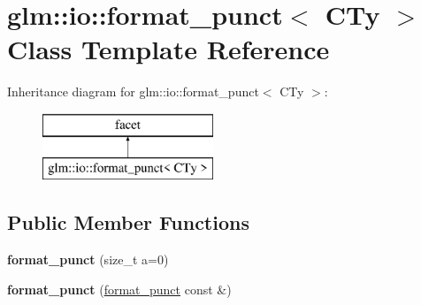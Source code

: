 \hypertarget{classglm_1_1io_1_1format__punct}{\section{glm\-:\-:io\-:\-:format\-\_\-punct$<$ C\-Ty $>$ Class Template Reference}
\label{classglm_1_1io_1_1format__punct}
}
Inheritance diagram for glm\-:\-:io\-:\-:format\-\_\-punct$<$ C\-Ty $>$\-:\begin{figure}[H]
\begin{center}
\leavevmode
\includegraphics[height=2.000000cm]{classglm_1_1io_1_1format__punct}
\end{center}
\end{figure}
\subsection*{Public Member Functions}
\begin{DoxyCompactItemize}
\item 
\hypertarget{classglm_1_1io_1_1format__punct_ae56e7a14fac2516658837281b9da4659}{{\bfseries format\-\_\-punct} (size\-\_\-t a=0)}\label{classglm_1_1io_1_1format__punct_ae56e7a14fac2516658837281b9da4659}

\item 
\hypertarget{classglm_1_1io_1_1format__punct_a89a8c3cfb0b975f3dd8c0416101c59b7}{{\bfseries format\-\_\-punct} (\hyperlink{classglm_1_1io_1_1format__punct}{format\-\_\-punct} const \&)}\label{classglm_1_1io_1_1format__punct_a89a8c3cfb0b975f3dd8c0416101c59b7}

\end{DoxyCompactItemize}
